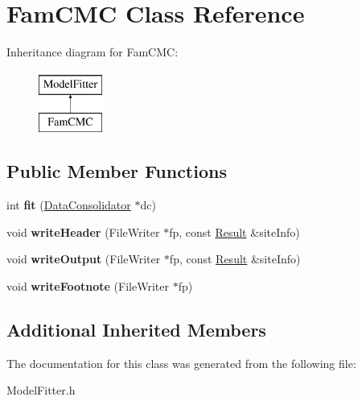 \hypertarget{classFamCMC}{\section{Fam\-C\-M\-C Class Reference}
\label{classFamCMC}
}
Inheritance diagram for Fam\-C\-M\-C\-:\begin{figure}[H]
\begin{center}
\leavevmode
\includegraphics[height=2.000000cm]{classFamCMC}
\end{center}
\end{figure}
\subsection*{Public Member Functions}
\begin{DoxyCompactItemize}
\item 
\hypertarget{classFamCMC_af0998c134d876c1f64170b1fe7dea080}{int {\bfseries fit} (\hyperlink{classDataConsolidator}{Data\-Consolidator} $\ast$dc)}\label{classFamCMC_af0998c134d876c1f64170b1fe7dea080}

\item 
\hypertarget{classFamCMC_a017101c6c6a0bb525a392fb3b20399cf}{void {\bfseries write\-Header} (File\-Writer $\ast$fp, const \hyperlink{classResult}{Result} \&site\-Info)}\label{classFamCMC_a017101c6c6a0bb525a392fb3b20399cf}

\item 
\hypertarget{classFamCMC_a2faed912df51ba93547a99ee6e3b56d7}{void {\bfseries write\-Output} (File\-Writer $\ast$fp, const \hyperlink{classResult}{Result} \&site\-Info)}\label{classFamCMC_a2faed912df51ba93547a99ee6e3b56d7}

\item 
\hypertarget{classFamCMC_af373263e19607d74dde498b210651dbf}{void {\bfseries write\-Footnote} (File\-Writer $\ast$fp)}\label{classFamCMC_af373263e19607d74dde498b210651dbf}

\end{DoxyCompactItemize}
\subsection*{Additional Inherited Members}


The documentation for this class was generated from the following file\-:\begin{DoxyCompactItemize}
\item 
Model\-Fitter.\-h\end{DoxyCompactItemize}
